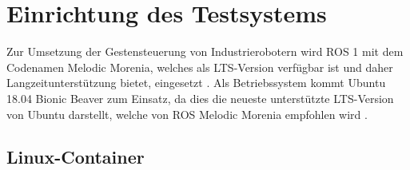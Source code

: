 \section{Einrichtung des Testsystems}
Zur Umsetzung der Gestensteuerung von Industrierobotern wird ROS 1 mit dem Codenamen Melodic Morenia, welches als LTS-Version verfügbar ist und daher Langzeitunterstützung bietet, eingesetzt \cite{robot_operating_system_2020}. Als Betriebssystem kommt Ubuntu 18.04 Bionic Beaver zum Einsatz, da dies die neueste unterstützte LTS-Version von Ubuntu darstellt, welche von ROS Melodic Morenia empfohlen wird \cite{ros_distributions_nodate}.

\subsection{Linux-Container}
